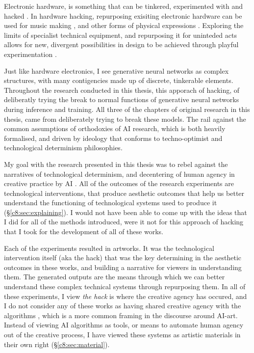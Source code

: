 Electronic hardware, is something that can be tinkered, experimented with and hacked \citep{collins2004hardware, grand2004hardware}. 
In hardware hacking, repurposing exisiting electronic hardware can be used for music making \citep{collins2009handmade}, and other forms of physical expressions \citep{hartmann2008hacking}.
Exploring the limits of specialist technical equipment, and repurposing it for uninteded acts allows for new, divergent possibilities in design to be achieved through playful experimentation \citep{goddard2015playful}.

Just like hardware electronics, I see generative neural networks as complex structures, with many contigencies made up of discrete, tinkerable elements.
Throughout the research conducted in this thesis, this apporach of hacking, of deliberatly trying the break to normal functions of generative neural networks during inference and training. 
All three of the chapters of original research in this thesis, came from deliberately trying to break these models.
The rail against the common assumptions of orthodoxies of AI research, which is both heavily formalised, and driven by ideology \citep{sias2021ideology} that conforms to techno-optimist \citep{andreesen2023techno} and technological determinism \citep{drew2016technological} philosophies. 

My goal with the research presented in this thesis was to rebel against the narratives of technological determinism, and decentering of human agency in creative practice by AI \citep{zeilinger2021tactical}.
All of the outcomes of the research experiments are technological interventions, that produce aesthetic outcomes that help us better understand the functioning of technological systems used to produce it (\S \ref{c8:sec:explaining}). 
I would not have been able to come up with the ideas that I did for all of the methods introduced, were it not for this approach of hacking that I took for the development of all of these works.

Each of the experiments resulted in artworks.
It was the technological intervention itself (aka the hack) that was the key determining in the aesthetic outcomes in these works, and building a narrative for viewers in understanding them.
The generated outputs are the means through which we can better understand these complex technical systems through repurposing them.
In all of these experiments, I view \textit{the hack} is where the creative agency has occured, and I do not consider any of these works as having shared creative agency with the algorithms \citep{moruzzi2022creative}, which is a more common framing in the discourse around AI-art.
Instead of viewing AI algorithms as tools, or means to automate human agency out of the creative process, I have viewed these systems as artistic materials in their own right (\S \ref{c8:sec:material}).

